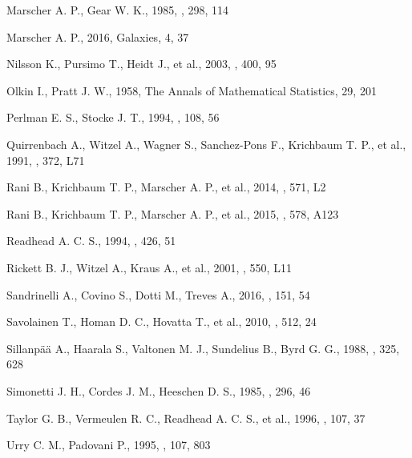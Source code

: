 \documentclass[a4paper,fleqn,usenatbib]{mnras}
\begin{document}
\begin{thebibliography}{99}
Marscher A. P., Gear W. K., 1985, \apj, 298, 114

Marscher A. P., 2016, Galaxies, 4, 37

Nilsson K., Pursimo T., Heidt J., et al., 2003, \aap, 400, 95

Olkin I., Pratt J. W., 1958, The Annals of Mathematical Statistics, 29, 201

Perlman E. S., Stocke J. T., 1994, \aj, 108, 56

Quirrenbach A., Witzel A., Wagner S., Sanchez-Pons F., Krichbaum T. P., et al., 1991, \apj, 372, L71

Rani B., Krichbaum T. P., Marscher A. P., et al., 2014, \aap, 571, L2

Rani B., Krichbaum T. P., Marscher A. P., et al., 2015, \aap, 578, A123

Readhead A. C. S., 1994, \apj, 426, 51

Rickett B. J., Witzel A., Kraus A., et al., 2001, \apj, 550, L11

Sandrinelli A., Covino S., Dotti M., Treves A., 2016, \aj, 151, 54

Savolainen T., Homan D. C., Hovatta T., et al., 2010, \aap, 512, 24

Sillanp\"a\"a A., Haarala S., Valtonen M. J., Sundelius B., Byrd G. G., 1988, \apj, 325, 628

Simonetti J. H., Cordes J. M., Heeschen D. S., 1985, \apj, 296, 46

Taylor G. B., Vermeulen R. C., Readhead A. C. S., et al., 1996, \apjs, 107, 37

Urry C. M., Padovani P., 1995, \pasp, 107, 803


\end{thebibliography}
\end{document}
